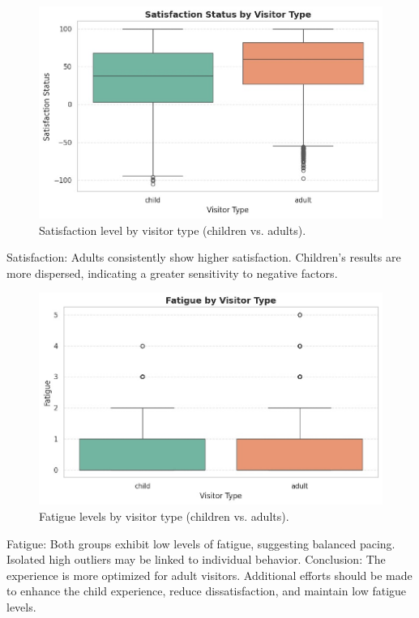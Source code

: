 \documentclass[12pt]{article}
\begin{document}
\begin{figure}[H]
    \centering
    \includegraphics[width=1\textwidth]{satisfaction_by_type.png}
    \caption{Satisfaction level by visitor type (children vs. adults).}
    \label{fig:satisfaction-type}
\end{figure}

Satisfaction:
Adults consistently show higher satisfaction. Children’s results are more dispersed, indicating a greater sensitivity to negative factors.


\begin{figure}[H]
    \centering
    \includegraphics[width=1\textwidth]{fatigue_by_type.png}
    \caption{Fatigue levels by visitor type (children vs. adults).}
    \label{fig:fatigue-type}
\end{figure}

Fatigue:
Both groups exhibit low levels of fatigue, suggesting balanced pacing. Isolated high outliers may be linked to individual behavior.
Conclusion:
The experience is more optimized for adult visitors. Additional efforts should be made to enhance the child experience, reduce dissatisfaction, and maintain low fatigue levels.
\end{document}
